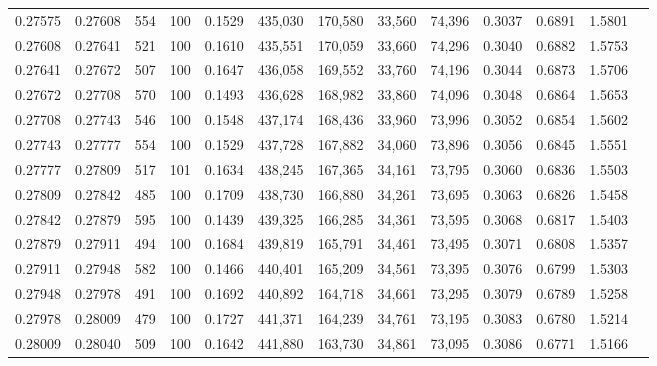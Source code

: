 \begin{tabular}{rrrrrrrrrrrrr}
0.27575 & 0.27608 &   554 & 100 &                                     0.1529 & 435,030 & 170,580 &  33,560 &  74,396 & 0.3037 & 0.6891 & 1.5801 \\
0.27608 & 0.27641 &   521 & 100 &                                     0.1610 & 435,551 & 170,059 &  33,660 &  74,296 & 0.3040 & 0.6882 & 1.5753 \\
0.27641 & 0.27672 &   507 & 100 &                                     0.1647 & 436,058 & 169,552 &  33,760 &  74,196 & 0.3044 & 0.6873 & 1.5706 \\
0.27672 & 0.27708 &   570 & 100 &                                     0.1493 & 436,628 & 168,982 &  33,860 &  74,096 & 0.3048 & 0.6864 & 1.5653 \\
0.27708 & 0.27743 &   546 & 100 &                                     0.1548 & 437,174 & 168,436 &  33,960 &  73,996 & 0.3052 & 0.6854 & 1.5602 \\
0.27743 & 0.27777 &   554 & 100 &                                     0.1529 & 437,728 & 167,882 &  34,060 &  73,896 & 0.3056 & 0.6845 & 1.5551 \\
0.27777 & 0.27809 &   517 & 101 &                                     0.1634 & 438,245 & 167,365 &  34,161 &  73,795 & 0.3060 & 0.6836 & 1.5503 \\
0.27809 & 0.27842 &   485 & 100 &                                     0.1709 & 438,730 & 166,880 &  34,261 &  73,695 & 0.3063 & 0.6826 & 1.5458 \\
0.27842 & 0.27879 &   595 & 100 &                                     0.1439 & 439,325 & 166,285 &  34,361 &  73,595 & 0.3068 & 0.6817 & 1.5403 \\
0.27879 & 0.27911 &   494 & 100 &                                     0.1684 & 439,819 & 165,791 &  34,461 &  73,495 & 0.3071 & 0.6808 & 1.5357 \\
0.27911 & 0.27948 &   582 & 100 &                                     0.1466 & 440,401 & 165,209 &  34,561 &  73,395 & 0.3076 & 0.6799 & 1.5303 \\
0.27948 & 0.27978 &   491 & 100 &                                     0.1692 & 440,892 & 164,718 &  34,661 &  73,295 & 0.3079 & 0.6789 & 1.5258 \\
0.27978 & 0.28009 &   479 & 100 &                                     0.1727 & 441,371 & 164,239 &  34,761 &  73,195 & 0.3083 & 0.6780 & 1.5214 \\
0.28009 & 0.28040 &   509 & 100 &                                     0.1642 & 441,880 & 163,730 &  34,861 &  73,095 & 0.3086 & 0.6771 & 1.5166 \\

\end{tabular}

